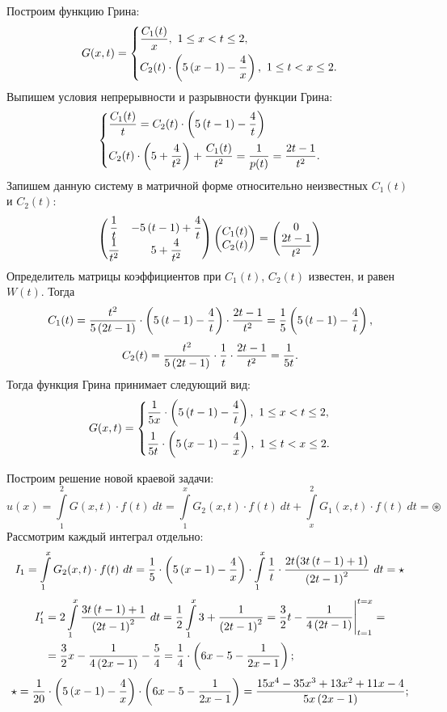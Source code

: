 \begin{enumerate}
				Построим функцию Грина:
				\[ G(x, t) = \left\lbrace \begin{aligned} 
					& \frac{C_1(t)}{x}, ~ 1 \le x < t \le 2, \\
					& C_2(t) \cdot \left( 5 \left( x - 1 \right) - \frac{4}{x} \right), ~ 1 \le t < x \le 2.
				 \end{aligned} \right. \]
				Выпишем условия непрерывности и разрывности функции Грина:
				\[ \left\lbrace \begin{aligned} 
					& \frac{C_1(t)}{t} = C_2(t) \cdot \left( 5 \left( t - 1 \right) - \frac{4}{t} \right) \\
					& C_2(t) \cdot \left( 5 + \frac{4}{t^2} \right) + \frac{C_1(t)}{t^2} = \frac{1}{p(t)} = \frac{2t - 1}{t^2}.
				 \end{aligned} \right. \]
				Запишем данную систему в матричной форме относительно неизвестных $C_1(t)$ и $C_2(t)$:
				\[ \begin{pmatrix} 
					\dfrac{1}{t} & -5 \left( t - 1 \right) + \dfrac{4}{t} \\
					\dfrac{1}{t^2} & 5 + \dfrac{4}{t^2}
				\end{pmatrix} \begin{pmatrix} C_1(t) \\ C_2(t) \end{pmatrix} = \begin{pmatrix} 0 \\ \dfrac{2t - 1}{t^2} \end{pmatrix} \]
				Определитель матрицы коэффициентов при $C_1(t)$, $C_2(t)$ известен, и равен $W(t)$. Тогда
				\[ C_1(t) = \frac{t^2}{5\left( 2t - 1 \right)} \cdot \left( 5 \left( t - 1 \right) - \frac{4}{t} \right) \cdot \frac{2t - 1}{t^2} = \frac{1}{5} \left( 5 \left( t - 1 \right) - \frac{4}{t} \right), \] 
				\[ C_2(t) = \frac{t^2}{5\left( 2t - 1 \right)} \cdot \frac{1}{t} \cdot \frac{2t - 1}{t^2} = \frac{1}{5t}. \]
				Тогда функция Грина принимает следующий вид:
				\[ G(x, t) = \left\lbrace \begin{aligned} 
					& \frac{1}{5x} \cdot \left( 5 \left( t - 1 \right) - \frac{4}{t} \right), ~ 1 \le x < t \le 2, \\
					& \frac{1}{5t} \cdot \left( 5 \left( x - 1 \right) - \frac{4}{x} \right), ~ 1 \le t < x \le 2.
				 \end{aligned} \right. \] 

				Построим решение новой краевой задачи:
				\[ u(x) = \int\limits_1^2 G(x, t) \cdot f(t) ~ dt = \int\limits_1^x G_2(x, t) \cdot f(t) ~ dt + \int\limits_x^2 G_1(x, t) \cdot f(t) ~ dt = \circledast \]
				Рассмотрим каждый интеграл отдельно:
				\[
					I_1 = \int\limits_1^x G_2(x, t) \cdot f(t) ~ dt = \frac{1}{5} \cdot \left( 5 \left( x - 1 \right) - \frac{4}{x} \right) \cdot \int\limits_1^x \frac{1}{t} \cdot \frac{2t \bigl( 3t \left( t - 1 \right) + 1 \bigr)}{\left( 2t - 1 \right)^2} ~ dt = \star
				\]
				\[ \begin{split} 
					I'_1 &= 2 \int\limits_1^x \frac{3t \left( t - 1 \right) + 1}{\left( 2t - 1 \right)^2} ~ dt = \frac{1}{2} \int\limits_1^x 3 + \frac{1}{\left( 2t - 1 \right)^2} = \frac{3}{2} t - \frac{1}{4 \left( 2t - 1 \right)} \Biggl\vert \Biggr._{t = 1}^{t = x} = \\
					&= \frac{3}{2} x - \frac{1}{4 \left( 2x - 1 \right)} - \frac{5}{4} = \frac{1}{4} \cdot \left( 6x - 5 - \frac{1}{2x - 1} \right);
				\end{split} \]
				\[ 
					\star = \frac{1}{20} \cdot \left( 5 \left( x - 1 \right) - \frac{4}{x} \right) \cdot \left( 6x - 5 - \frac{1}{2x - 1} \right) = \frac{15x^4 - 35 x^3 + 13x^2 + 11x - 4}{5x \left( 2x - 1 \right)};
				\]


\end{enumerate}
